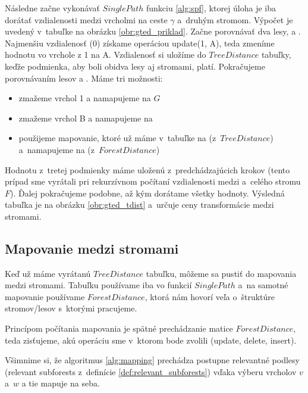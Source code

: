 

Následne začne vykonávať $SinglePath$ funkciu \ref{alg:spf}, ktorej úloha je iba dorátať
vzdialenosti medzi vrcholmi na ceste $\gamma$ a~druhým stromom.
Výpočet je uvedený v~tabuľke na obrázku \ref{obr:gted_priklad}.
Začne porovnávať dva lesy,  a . Najmenšiu vzdialenosť (0) získame operáciou
update(1, A), teda zmeníme hodnotu vo vrchole z 1 na A. Vzdialenosť si uložíme do $TreeDistance$
tabuľky, keďže podmienka, aby boli obidva lesy aj stromami, platí.
Pokračujeme porovnávaním lesov  a .
Máme tri možnosti:
\begin{itemize}
  \item zmažeme vrchol 1 a namapujeme \set{} na $G$
  \item zmažeme vrchol B a namapujeme  na 
  \item použijeme mapovanie, ktoré už máme v~tabuľke  na  (z~$TreeDistance$)
    a~namapujeme \set{} na  (z~$ForestDistance$)
\end{itemize}
Hodnotu z~tretej podmienky máme uloženú z~predchádzajúcich krokov (tento prípad sme vyrátali
pri rekurzívnom počítaní vzdialenosti medzi  a~celého stromu $F$).
Ďalej pokračujeme podobne, až kým dorátame všetky hodnoty.
Výsledná tabuľka je na obrázku \ref{obr:gted_tdist} a~určuje ceny transformácie
medzi stromami.






\subsection{Mapovanie medzi stromami}

Keď už máme vyrátanú $TreeDistance$ tabuľku, môžeme sa pustiť do mapovania medzi
stromami. Tabuľku používame iba vo funkcií $SinglePath$ a~na samotné mapovanie
používame $ForestDistance$, ktorá nám hovorí veľa o~štruktúre stromov/lesov
s~ktorými pracujeme.



Princípom počítania mapovania je spätné prechádzanie matice $ForestDistance$, teda
zisťujeme, akú operáciu sme v~ktorom bode zvolili (update, delete, insert).

Všimnime si, že algoritmus \ref{alg:mapping} prechádza postupne
relevantné podlesy (relevant subforests z~definície \ref{def:relevant_subforests})
vďaka výberu vrcholov $v$ a~$w$ a tie mapuje na seba.

